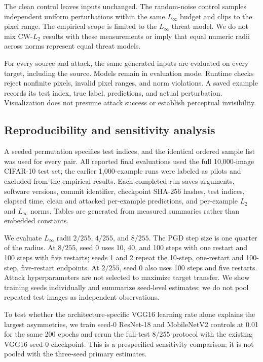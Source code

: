 \documentclass[10pt]{article}
\begin{document}
The clean control leaves inputs unchanged. The random-noise control samples independent uniform perturbations within the same $L_\infty$ budget and clips to the pixel range. The empirical scope is limited to the $L_\infty$ threat model. We do not mix CW-$L_2$ results with these measurements or imply that equal numeric radii across norms represent equal threat models.

For every source and attack, the same generated inputs are evaluated on every target, including the source. Models remain in evaluation mode. Runtime checks reject nonfinite pixels, invalid pixel ranges, and norm violations. A saved example records its test index, true label, predictions, and actual perturbation. Visualization does not presume attack success or establish perceptual invisibility.

\subsection{Reproducibility and sensitivity analysis}
A seeded permutation specifies test indices, and the identical ordered sample list was used for every pair. All reported final evaluations used the full 10,000-image CIFAR-10 test set; the earlier 1,000-example runs were labeled as pilots and excluded from the empirical results. Each completed run saves arguments, software versions, commit identifier, checkpoint SHA-256 hashes, test indices, elapsed time, clean and attacked per-example predictions, and per-example $L_2$ and $L_\infty$ norms. Tables are generated from measured summaries rather than embedded constants.

We evaluate $L_\infty$ radii $2/255$, $4/255$, and $8/255$. The PGD step size is one quarter of the radius. At $8/255$, seed 0 uses 10, 40, and 100 steps with one restart and 100 steps with five restarts; seeds 1 and 2 repeat the 10-step, one-restart and 100-step, five-restart endpoints. At $2/255$, seed 0 also uses 100 steps and five restarts. Attack hyperparameters are not selected to maximize target transfer. We show training seeds individually and summarize seed-level estimates; we do not pool repeated test images as independent observations.

To test whether the architecture-specific VGG16 learning rate alone explains the largest asymmetries, we train seed-0 ResNet-18 and MobileNetV2 controls at 0.01 for the same 200 epochs and rerun the full-test $8/255$ protocol with the existing VGG16 seed-0 checkpoint. This is a prespecified sensitivity comparison; it is not pooled with the three-seed primary estimates.
\end{document}
